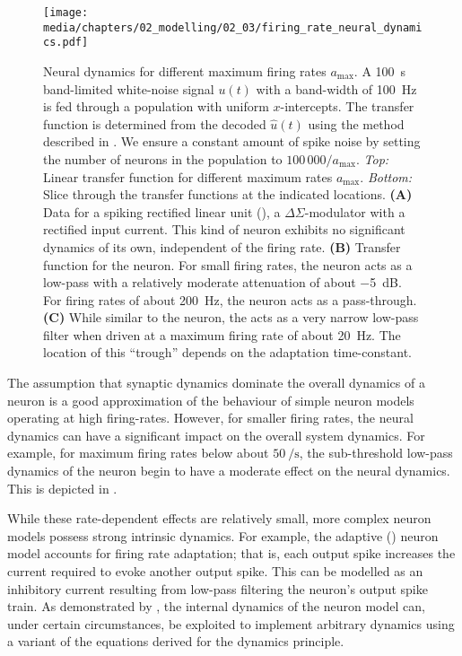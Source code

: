 \begin{figure}[t]
	\texttt{[image: media/chapters/02\_modelling/02\_03/firing\_rate\_neural\_dynamics.pdf]}
	\caption[Neural dynamics for different maximum firing rates]{Neural dynamics for different maximum firing rates $a_\mathrm{max}$. A \SI{100}{\second} band-limited white-noise signal $u(t)$ with a band-width of \SI{100}{\hertz} is fed through a \NEF population with uniform $x$-intercepts.
	The transfer function is determined from the decoded $\hat u(t)$ using the method described in \citet[Section~4.3.3]{eliasmith2003neural}.
	We ensure a constant amount of spike noise by setting the number of neurons in the population to $100\,000 / a_\mathrm{max}$. \emph{Top:} Linear transfer function for different maximum rates $a_\mathrm{max}$. \emph{Bottom:} Slice through the transfer functions at the indicated locations.
	\textbf{(A)} Data for a spiking rectified linear unit (\ReLU), a $\Delta\Sigma$-modulator with a rectified input current. This kind of neuron exhibits no significant dynamics of its own, independent of the firing rate. \textbf{(B)} Transfer function for the \LIF neuron. For small firing rates, the neuron acts as a low-pass with a relatively moderate attenuation of about \SI{-5}{\deci\bel}. For firing rates of about \SI{200}{\hertz}, the neuron acts as a pass-through. \textbf{(C)} While similar to the \LIF neuron, the \ALIF
	acts as a very narrow low-pass filter when driven at a maximum firing rate of about \SI{20}{\hertz}. The location of this \enquote{trough} depends on the adaptation time-constant.}
	\label{fig:neural_dynamics_firing_rates}
\end{figure}

The assumption that synaptic dynamics dominate the overall dynamics of a neuron is a good approximation of the behaviour of simple neuron models operating at high firing-rates.
However, for smaller firing rates, the neural dynamics can have a significant impact on the overall system dynamics.
For example, for maximum firing rates below about $\SI{50}{\per\second}$, the sub-threshold low-pass dynamics of the \LIF neuron begin to have a moderate effect on the neural dynamics.
This is depicted in .

While these rate-dependent effects are relatively small, more complex neuron models possess strong intrinsic dynamics.
For example, the adaptive \LIF (\ALIF) neuron model \citep[Chapter~14]{koch1999biophysics} accounts for firing rate adaptation; that is, each output spike increases the current required to evoke another output spike.
This can be modelled as an inhibitory current resulting from low-pass filtering the neuron's output spike train.
As demonstrated by \citet[Chapter~7]{tripp2009search}, the internal dynamics of the \ALIF neuron model can, under certain circumstances, be exploited to implement arbitrary dynamics using a variant of the equations derived for the \NEF dynamics principle.

